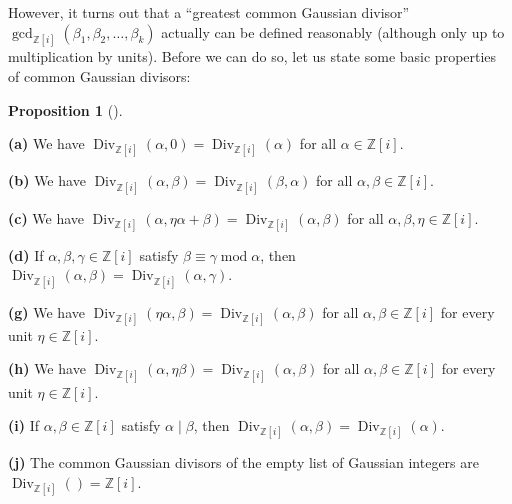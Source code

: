 \documentclass[numbers=enddot,12pt,final,onecolumn,notitlepage]{scrartcl}%
\numberwithin{exer}{subsection}
\theoremstyle{definition}
\newtheorem{prop}[theo]{Proposition}
\newenvironment{proposition}[1][]
{\begin{prop}[#1]\begin{leftbar}}
{\end{leftbar}\end{prop}}
\begin{document}
However, it turns out that a \textquotedblleft greatest common Gaussian
divisor\textquotedblright\ $\gcd\nolimits_{\mathbb{Z}\left[  i\right]
}\left(  \beta_{1},\beta_{2},\ldots,\beta_{k}\right)  $ actually can be
defined reasonably (although only up to multiplication by units). Before we
can do so, let us state some basic properties of common Gaussian divisors:

\begin{proposition}
\label{prop.Z[i].gauss.divrules}\textbf{(a)} We have $\operatorname*{Div}%
\nolimits_{\mathbb{Z}\left[  i\right]  }\left(  \alpha,0\right)
=\operatorname*{Div}\nolimits_{\mathbb{Z}\left[  i\right]  }\left(
\alpha\right)  $ for all $\alpha\in\mathbb{Z}\left[  i\right]  $.

\textbf{(b)} We have $\operatorname*{Div}\nolimits_{\mathbb{Z}\left[
i\right]  }\left(  \alpha,\beta\right)  =\operatorname*{Div}%
\nolimits_{\mathbb{Z}\left[  i\right]  }\left(  \beta,\alpha\right)  $ for all
$\alpha,\beta\in\mathbb{Z}\left[  i\right]  $.

\textbf{(c)} We have $\operatorname*{Div}\nolimits_{\mathbb{Z}\left[
i\right]  }\left(  \alpha,\eta\alpha+\beta\right)  =\operatorname*{Div}%
\nolimits_{\mathbb{Z}\left[  i\right]  }\left(  \alpha,\beta\right)  $ for all
$\alpha,\beta,\eta\in\mathbb{Z}\left[  i\right]  $.

\textbf{(d)} If $\alpha,\beta,\gamma\in\mathbb{Z}\left[  i\right]  $ satisfy
$\beta\equiv\gamma\operatorname{mod}\alpha$, then $\operatorname*{Div}%
\nolimits_{\mathbb{Z}\left[  i\right]  }\left(  \alpha,\beta\right)
=\operatorname*{Div}\nolimits_{\mathbb{Z}\left[  i\right]  }\left(
\alpha,\gamma\right)  $.

\textbf{(g)} We have $\operatorname*{Div}\nolimits_{\mathbb{Z}\left[
i\right]  }\left(  \eta\alpha,\beta\right)  =\operatorname*{Div}%
\nolimits_{\mathbb{Z}\left[  i\right]  }\left(  \alpha,\beta\right)  $ for all
$\alpha,\beta\in\mathbb{Z}\left[  i\right]  $ for every unit $\eta
\in\mathbb{Z}\left[  i\right]  $.

\textbf{(h)} We have $\operatorname*{Div}\nolimits_{\mathbb{Z}\left[
i\right]  }\left(  \alpha,\eta\beta\right)  =\operatorname*{Div}%
\nolimits_{\mathbb{Z}\left[  i\right]  }\left(  \alpha,\beta\right)  $ for all
$\alpha,\beta\in\mathbb{Z}\left[  i\right]  $ for every unit $\eta
\in\mathbb{Z}\left[  i\right]  $.

\textbf{(i)} If $\alpha,\beta\in\mathbb{Z}\left[  i\right]  $ satisfy
$\alpha\mid\beta$, then $\operatorname*{Div}\nolimits_{\mathbb{Z}\left[
i\right]  }\left(  \alpha,\beta\right)  =\operatorname*{Div}%
\nolimits_{\mathbb{Z}\left[  i\right]  }\left(  \alpha\right)  $.

\textbf{(j)} The common Gaussian divisors of the empty list of Gaussian
integers are $\operatorname*{Div}\nolimits_{\mathbb{Z}\left[  i\right]
}\left(  {}\right)  =\mathbb{Z}\left[  i\right]  $.
\end{proposition}
\end{document}
